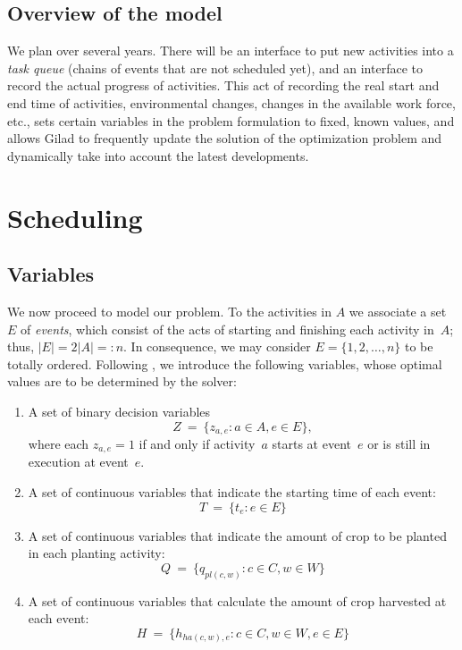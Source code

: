 \documentclass[11pt,reqno]{amsart}
\numberwithin{equation}{section}
\begin{document}
\subsection{Overview of the model}

We plan over several years. There will be an interface to put new activities into a
\emph{task queue} (chains of events that are not scheduled yet), and an interface to
record the actual progress of activities. This act of recording the real start and end
time of activities, environmental changes, changes in the available work force, etc., sets
certain variables in the problem formulation to fixed, known values, and allows Gilad to
frequently update the solution of the optimization problem and dynamically take into
account the latest developments.

\section{Scheduling}

\subsection{Variables}

We now proceed to model our problem.  To the activities in $A$ we associate a set~$E$ of
\emph{events}, which consist of the acts of starting and finishing each activity in~$A$;
thus, $|E|=2|A|=:n$. In consequence, we may consider $E=\{1,2,\dots, n\}$ to be
totally ordered.  Following \cite{artigues-etal11}, we introduce the following variables,
whose optimal values are to be determined by the solver:

\begin{enumerate}
\item A set of binary decision variables 
  \[
     Z
     \ = \
     \big\{z_{a,e}: a\in A, e\in E\big\},
  \]
  where each $z_{a,e}=1$ if and only if activity~$a$ starts at
  event~$e$ or is still in execution at event~$e$.

\smallskip
\item A set of continuous variables that indicate the starting time of each event:
  \[
     T
     \ = \
     \big\{t_e : e\in E\big\}
  \]

\smallskip
\item A set of continuous variables that indicate the amount of crop to be planted in each
  planting activity:
  \[
     Q
     \ = \
     \big\{q_{pl(c,w)} : c\in C, w\in W\big\}
  \]

\smallskip
\item A set of continuous variables that calculate the amount of crop harvested at each event:
  \[
     H
     \ = \
     \big\{h_{ha(c,w),e} : c\in C, w\in W, e\in E\big\}
  \]

\end{enumerate}
\end{document}
